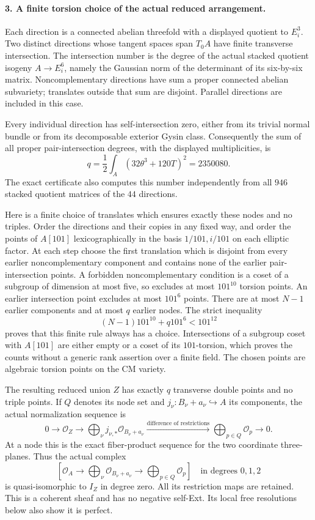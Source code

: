 \paragraph{3. A finite torsion choice of the actual reduced arrangement.}
Each direction is a connected abelian threefold with a displayed
quotient to $E_i^3$. Two distinct directions whose tangent spaces
span $T_0A$ have finite transverse intersection. The intersection
number is the degree of the actual stacked quotient isogeny
$A\to E_i^6$, namely the Gaussian norm of the determinant of
its six-by-six matrix. Noncomplementary directions have sum a
proper connected abelian subvariety; translates outside that
sum are disjoint. Parallel directions are included in this case.

Every individual direction has self-intersection zero, either
from its trivial normal bundle or from its decomposable exterior
Gysin class. Consequently the sum of all proper pair-intersection
degrees, with the displayed multiplicities, is
\[
 q=\frac12\int_A(32\theta^3+120T)^2=2350080.                \tag{N23.11}
\]
The exact certificate also computes this number independently
from all $946$ stacked quotient matrices of the $44$ directions.

Here is a finite choice of translates which ensures exactly these
nodes and no triples. Order the directions and their copies in
any fixed way, and order the points of $A[101]$ lexicographically
in the basis $1/101,i/101$ on each elliptic factor. At each step
choose the first translation which is disjoint from every earlier
noncomplementary component and contains none of the earlier
pair-intersection points. A forbidden noncomplementary condition
is a coset of a subgroup of dimension at most five, so excludes
at most $101^{10}$ torsion points. An earlier intersection point
excludes at most $101^6$ points. There are at most $N-1$ earlier
components and at most $q$ earlier nodes. The strict inequality
\[
              (N-1)101^{10}+q101^6<101^{12}                 \tag{N23.12}
\]
proves that this finite rule always has a choice. Intersections
of a subgroup coset with $A[101]$ are either empty or a coset
of its $101$-torsion, which proves the counts without a generic
rank assertion over a finite field. The chosen points are
algebraic torsion points on the CM variety.

The resulting reduced union $Z$ has exactly $q$ transverse
double points and no triple points. If $Q$ denotes its node set
and $j_\nu:B_\nu+a_\nu\hookrightarrow A$ its components, the
actual normalization sequence is
\[
 0\longrightarrow\mathcal O_Z\longrightarrow
 \bigoplus_\nu j_{\nu,*}\mathcal O_{B_\nu+a_\nu}
 \xrightarrow{\text{difference of restrictions}}
 \bigoplus_{p\in Q}\mathcal O_p\longrightarrow0.            \tag{N23.13}
\]
At a node this is the exact fiber-product sequence for the two
coordinate three-planes. Thus the actual complex
\[
 \left[\mathcal O_A\longrightarrow
       \bigoplus_\nu\mathcal O_{B_\nu+a_\nu}
       \longrightarrow\bigoplus_{p\in Q}\mathcal O_p\right]
                    \quad\text{in degrees }0,1,2           \tag{N23.14}
\]
is quasi-isomorphic to $I_Z$ in degree zero. All its restriction
maps are retained. This is a coherent sheaf and has no negative
self-Ext. Its local free resolutions below also show it is perfect.

